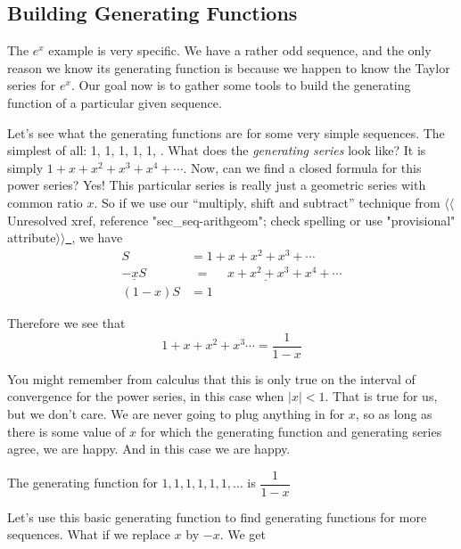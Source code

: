 \documentclass[10pt,]{book}
\theoremstyle{plain}
\theoremstyle{definition}
\theoremstyle{definition}
\theoremstyle{definition}
\theoremstyle{definition}
\numberwithin{equation}{chapter}
\newcommand{\lt}{<}
\newcommand{\amp}{&}
\begin{document}
\subsection[{Building Generating Functions}]{Building Generating Functions}\label{subsection-24}
\hypertarget{p-1068}{}%
The \(e^x\) example is very specific. We have a rather odd sequence, and the only reason we know its generating function is because we happen to know the Taylor series for \(e^x\). Our goal now is to gather some tools to build the generating function of a particular given sequence.%
\par
\hypertarget{p-1069}{}%
Let's see what the generating functions are for some very simple sequences. The simplest of all: 1, 1, 1, 1, 1, \textellipsis{}. What does the \emph{generating series} look like? It is simply \(1 + x + x^2 + x^3 + x^4 + \cdots\). Now, can we find a closed formula for this power series? Yes! This particular series is really just a geometric series with common ratio \(x\). So if we use our ``multiply, shift and subtract'' technique from {$\langle\langle$Unresolved xref, reference "sec\_seq-arithgeom"; check spelling or use "provisional" attribute$\rangle\rangle$}\hyperlink{}{~}, we have%
\begin{align*}
S \amp  = 1 + x + x^2 + x^3 + \cdots\\
\underline{- xS} \amp  \underline{\,\, = ~~~~~~ x + x^2 + x^3 + x^4 + \cdots}\\
(1-x)S \amp  = 1
\end{align*}
%
\par
\hypertarget{p-1070}{}%
Therefore we see that%
\begin{equation*}
1 + x + x^2 + x^3 \cdots = \dfrac{1}{1-x}
\end{equation*}
%
\par
\hypertarget{p-1071}{}%
You might remember from calculus that this is only true on the interval of convergence for the power series, in this case when \(|x| \lt  1\). That is true for us, but we don't care. We are never going to plug anything in for \(x\), so as long as there is some value of \(x\) for which the generating function and generating series agree, we are happy. And in this case we are happy.%
\begin{assemblage}[\(1,1,1,\ldots\)]\label{assemblage-12}
\hypertarget{p-1072}{}%
The generating function for \(1,1,1,1,1,1,\ldots\) is \(\dfrac{1}{1-x}\)%
\end{assemblage}
\hypertarget{p-1073}{}%
Let's use this basic generating function to find generating functions for more sequences. What if we replace \(x\) by \(-x\). We get%
\end{document}
